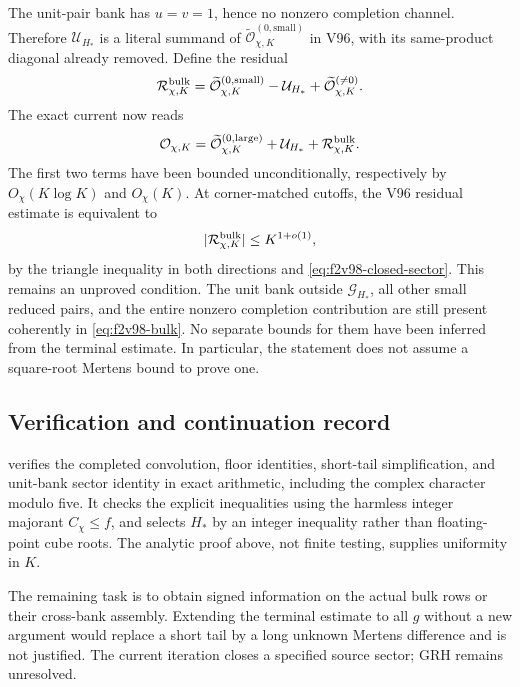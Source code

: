 \documentclass[11pt]{article}
\theoremstyle{definition}
\theoremstyle{remark}
\begin{document}
The unit-pair bank has \(u=v=1\), hence no nonzero completion channel.
Therefore \(\mathcal U_{H_*}\) is a literal summand of
\(\widetilde{\mathcal O}^{(0,\mathrm{small})}_{\chi,K}\) in V96,
with its same-product diagonal already removed.  Define the residual
\begin{equation}
 \mathcal R_{\chi,K}^{\rm bulk}
 =\widetilde{\mathcal O}^{(0,\mathrm{small})}_{\chi,K}
      -\mathcal U_{H_*}
      +\widetilde{\mathcal O}^{(\ne0)}_{\chi,K}.
 \label{eq:f2v98-bulk}
\end{equation}
The exact current now reads
\begin{equation}
 \mathcal O_{\chi,K}
 =\widetilde{\mathcal O}^{(0,\mathrm{large})}_{\chi,K}
        +\mathcal U_{H_*}+\mathcal R_{\chi,K}^{\rm bulk}.
 \label{eq:f2v98-current}
\end{equation}
The first two terms have been bounded unconditionally, respectively
by \(O_\chi(K\log K)\) and \(O_\chi(K)\).
At corner-matched cutoffs, the V96 residual estimate is equivalent to
\begin{equation}
 |\mathcal R_{\chi,K}^{\rm bulk}|\le K^{1+o(1)},
 \label{eq:f2v98-open-bulk}
\end{equation}
by the triangle inequality in both directions and
\eqref{eq:f2v98-closed-sector}.  This remains an unproved condition.
The unit bank outside \(\mathcal G_{H_*}\), all other small reduced
pairs, and the entire nonzero completion contribution are still present
coherently in \eqref{eq:f2v98-bulk}.  No separate bounds for them have
been inferred from the terminal estimate.  In particular, the statement
does not assume a square-root Mertens bound to prove one.

\subsection*{Verification and continuation record}

 verifies the completed
convolution, floor identities, short-tail simplification, and unit-bank
sector identity in exact arithmetic, including the complex character
modulo five.  It checks the explicit inequalities using the harmless
integer majorant \(C_\chi\le f\), and selects \(H_*\) by an integer
inequality rather than floating-point cube roots.  The analytic proof
above, not finite testing, supplies uniformity in \(K\).

The remaining task is to obtain signed information on the actual bulk
rows or their cross-bank assembly.  Extending the terminal estimate to
all \(g\) without a new argument would replace a short tail by a
long unknown Mertens difference and is not justified.  The current
iteration closes a specified source sector; GRH remains unresolved.
\end{document}
